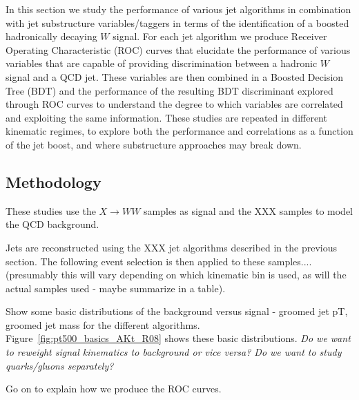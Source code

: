 In this section we study the performance of various jet algorithms in
combination with jet substructure variables/taggers in terms of the
identification of a boosted hadronically decaying $W$ signal. For each
jet algorithm we produce Receiver Operating Characteristic (ROC)
curves that elucidate the performance of various variables that are
capable of providing discrimination between a hadronic $W$ signal and
a QCD jet. These variables are then combined in a Boosted Decision Tree (BDT) and the performance of the resulting BDT discriminant
explored through ROC curves to understand the degree to which
variables are correlated and exploiting the same information. These
studies are repeated in different kinematic regimes, to explore both
the performance and correlations as a function of the jet boost, and
where substructure approaches may break down.

\subsection{Methodology}

These studies use the $X \rightarrow WW$ samples as signal and the XXX
samples to model the QCD background. 

Jets are reconstructed using the XXX jet algorithms described in the
previous section. The following event selection is then applied to these
samples....(presumably this will vary depending on which kinematic bin
is used, as will the actual samples used - maybe summarize in a table).

Show some basic distributions of the background versus signal -
groomed jet pT, groomed jet mass for the different
algorithms. Figure~\ref{fig:pt500_basics_AKt_R08} shows these basic
distributions. {\it Do we want to reweight signal kinematics to
background or vice versa? Do we want to study quarks/gluons separately?}

Go on to explain how we produce the ROC curves.

